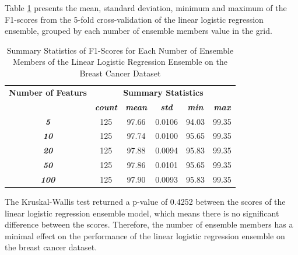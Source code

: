 \documentclass[10pt, conference]{IEEEtran}
\begin{document}
Table \ref{table: BC_member_linear_performance_metrics} presents the mean, standard deviation, minimum and maximum of the
F1-scores from the 5-fold cross-validation of the linear logistic regression ensemble, grouped by each number of ensemble members
value in the grid.
\begin{table}[H]
    \caption{Summary Statistics of F1-Scores for Each Number of Ensemble Members of the Linear Logistic Regression Ensemble on the Breast Cancer Dataset}
    \begin{center}
        \begin{tabular}{|c||c|c|c|c|c|}
            \hline
            \textbf{Number of Featurs}&\multicolumn{5}{|c|}{\textbf{Summary Statistics}} \\
            \cline{2-6}
                       &\textbf{\textit{count}} & \textbf{\textit{mean}} & \textbf{\textit{std}} & \textbf{\textit{min}} & \textbf{\textit{max}}\\
            \hline
            \textbf{\textit{5}} & 125 & 97.66 & 0.0106 & 94.03 & 99.35 \\
            \textbf{\textit{10}} & 125 & 97.74 & 0.0100 & 95.65 & 99.35 \\
            \textbf{\textit{20}} & 125 & 97.88 & 0.0094 & 95.83 & 99.35 \\
            \textbf{\textit{50}} & 125 & 97.86 & 0.0101 & 95.65 & 99.35 \\
            \textbf{\textit{100}} & 125 & 97.90 & 0.0093 & 95.83 & 99.35 \\
            \hline
        \end{tabular}
    \end{center}
    \label{table: BC_member_linear_performance_metrics}
\end{table}
The Kruskal-Wallis test returned a p-value of 0.4252 between the scores of the linear logistic regression ensemble model,
which means there is no significant difference between the scores. Therefore, the number of ensemble members
has a minimal effect on the performance of the linear logistic regression ensemble on the breast cancer dataset.
\end{document}
